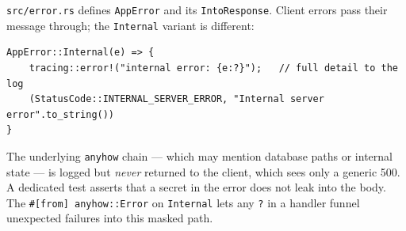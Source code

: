\verb|src/error.rs| defines \verb|AppError| and its \verb|IntoResponse|. Client
errors pass their message through; the \verb|Internal| variant is different:

\begin{lstlisting}
AppError::Internal(e) => {
    tracing::error!("internal error: {e:?}");   // full detail to the log
    (StatusCode::INTERNAL_SERVER_ERROR, "Internal server error".to_string())
}
\end{lstlisting}

The underlying \verb|anyhow| chain --- which may mention database paths or
internal state --- is logged but \emph{never} returned to the client, which sees
only a generic 500. A dedicated test asserts that a secret in the error does not
leak into the body. The \verb|#[from] anyhow::Error| on \verb|Internal| lets any
\verb|?| in a handler funnel unexpected failures into this masked path.
